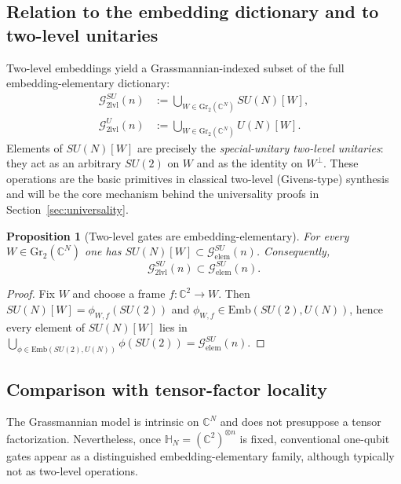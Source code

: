 \documentclass{article}%
\newtheorem{proposition}[theorem]{Proposition}
\theoremstyle{definition}
\numberwithin{equation}{section}
\newcommand{\C}{\mathbb{C}}
\newcommand{\Gr}{\mathrm{Gr}}
\newcommand{\Emb}{\mathrm{Emb}}
\begin{document}
\subsection{Relation to the embedding dictionary and to two-level unitaries}
\label{subsec:relation_to_dict}

Two-level embeddings yield a Grassmannian-indexed subset of the full embedding-elementary dictionary:
\[
\begin{aligned}
\mathcal{G}^{SU}_{\mathrm{2lvl}}(n)
&:=\bigcup_{W\in\Gr_2(\C^N)} SU(N)[W],\\
\mathcal{G}^{U}_{\mathrm{2lvl}}(n)
&:=\bigcup_{W\in\Gr_2(\C^N)} U(N)[W].
\end{aligned}
\]
Elements of $SU(N)[W]$ are precisely the \emph{special-unitary two-level unitaries}: they act as an
arbitrary $SU(2)$ on $W$ and as the identity on $W^\perp$. These operations are the basic primitives
in classical two-level (Givens-type) synthesis and will be the core mechanism behind the universality
proofs in Section~\ref{sec:universality}.

\begin{proposition}[Two-level gates are embedding-elementary]\label{prop:two_level_in_Gelem_SU2}
For every $W\in\Gr_2(\C^N)$ one has $SU(N)[W]\subset \mathcal{G}_{\mathrm{elem}}^{SU}(n)$. Consequently,
\[
\mathcal{G}_{\mathrm{2lvl}}^{SU}(n)\subset \mathcal{G}_{\mathrm{elem}}^{SU}(n).
\]
\end{proposition}

\begin{proof}
Fix $W$ and choose a frame $f:\C^2\to W$. Then $SU(N)[W]=\phi_{W,f}(SU(2))$ and
$\phi_{W,f}\in\Emb(SU(2),U(N))$, hence every element of $SU(N)[W]$ lies in
$\bigcup_{\phi\in\Emb(SU(2),U(N))}\phi(SU(2))=\mathcal{G}_{\mathrm{elem}}^{SU}(n)$.
\end{proof}


\subsection{Comparison with tensor-factor locality}
\label{subsec:comparison_tensor_locality}

The Grassmannian model is intrinsic on $\C^N$ and does not presuppose a tensor factorization.
Nevertheless, once $\mathbb{H}_N=(\C^2)^{\otimes n}$ is fixed, conventional one-qubit gates appear as
a distinguished embedding-elementary family, although typically not as two-level operations.
\end{document}
